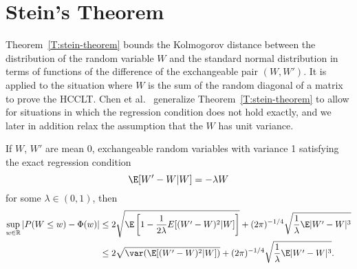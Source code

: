 \section{Stein's Theorem}
Theorem~\ref{T:stein-theorem} bounds the Kolmogorov distance between the
distribution of the random variable $W$ and the standard normal distribution
in terms of functions of the difference of the exchangeable pair $(W, W')$.  It is
applied to the situation where $W$ is the sum of the random diagonal of a matrix
to prove the HCCLT.  Chen et al.\ \cite{chen2010normal}
generalize Theorem~\ref{T:stein-theorem} to allow
for situations in which the regression condition does not hold exactly, and
we later in addition relax the assumption that the $W$ has unit variance.
\begin{theorem}[Stein]\label{T:stein-theorem}
  If $W$, $W'$ are mean 0, exchangeable random variables with variance 1
  satisfying the exact regression condition
  \begin{equation*}
    \E[W'-W|W] = -\lambda W
  \end{equation*}
  for some $\lambda \in (0,1)$, then
  \begin{align*}
    \sup_{w \in \mathbb{R}} |P(W \leq w) - \Phi(w)| &\leq
    2\sqrt{\E \left [1 - \frac{1}{2 \lambda}E[(W'-W)^2|W] \right ]} +
    (2 \pi)^{-1/4}\sqrt{\frac{1}{\lambda}\E |W'-W|^3} \\
    &\leq 2 \sqrt{\var (\E [(W'-W)^2|W])} +
    (2 \pi)^{-1/4}\sqrt{\frac{1}{\lambda}\E |W'-W|^3}.
  \end{align*}
\end{theorem}

